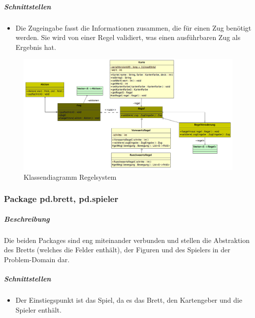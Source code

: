 \documentclass[12pt,halfparskip]{scrartcl}
\begin{document}
\subparagraph{Schnittstellen}
\begin{itemize}
	\item Die Zugeingabe fasst die Informationen zusammen, die für einen Zug benötigt werden. Sie wird von einer Regel validiert, was einen ausführbaren Zug als Ergebnis hat.
\end{itemize}

\begin{figure}[h]
	\centering
	\includegraphics[width=\textwidth]{pd_regelsystem}
	\caption{Klassendiagramm Regelsystem}
	\label{fig:pd_regelsystem}
\end{figure}

\clearpage
\subsubsection{Package pd.brett, pd.spieler}
\label{ssub:package_pd_brett}
\subparagraph{Beschreibung}
Die beiden Packages sind eng miteinander verbunden und stellen die Abstraktion des Bretts (welches die Felder enthält), der Figuren und des Spielers in der Problem-Domain dar.

\subparagraph{Schnittstellen}
\begin{itemize}
	\item Der Einstiegspunkt ist das Spiel, da es das Brett, den Kartengeber und die Spieler enthält.
\end{itemize}
\end{document}
